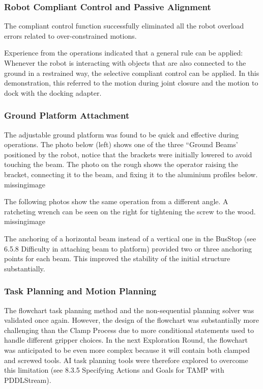 \subsubsection{Robot Compliant Control and Passive Alignment}
\label{subsubsection:exploration_4_robot_compliant_control_and_passive_alignment}

The compliant control function  successfully eliminated all the robot overload errors related to over-constrained motions. 

Experience from the operations indicated that a general rule can be applied: Whenever the robot is interacting with objects that are also connected to the ground in a restrained way, the selective compliant control can be applied. In this demonstration, this referred to the motion during joint closure and the motion to dock with the docking adapter.

\subsubsection{Ground Platform Attachment}
\label{subsubsection:exploration_4_ground_platform_attachment}

The adjustable ground platform  was found to be quick and effective during operations. The photo below (left) shows one of the three “Ground Beams' positioned by the robot, notice that the brackets were initially lowered to avoid touching the beam. The photo on the rough shows the operator raising the bracket, connecting it to the beam, and fixing it to the aluminium profiles below.
missingimage

The following photos show the same operation from a different angle. A ratcheting wrench can be seen on the right for tightening the screw to the wood.
missingimage

The anchoring of a horizontal beam instead of a vertical one in the BusStop (see 6.5.8 Difficulty in attaching beam to platform) provided two or three anchoring points for each beam. This improved the stability of the initial structure substantially.

\subsubsection{Task Planning and Motion Planning}
\label{subsubsection:exploration_4_task_planning_and_motion_planning}

The flowchart task planning method  and the non-sequential planning solver  was validated once again. However, the design of the flowchart  was substantially more challenging than the Clamp Process due to more conditional statements used to handle different gripper choices. 
In the next Exploration Round, the flowchart was anticipated to be even more complex because it will contain both clamped and screwed tools. AI task planning tools were therefore explored to overcome this limitation (see 8.3.5 Specifying Actions and Goals for TAMP with PDDLStream). 

